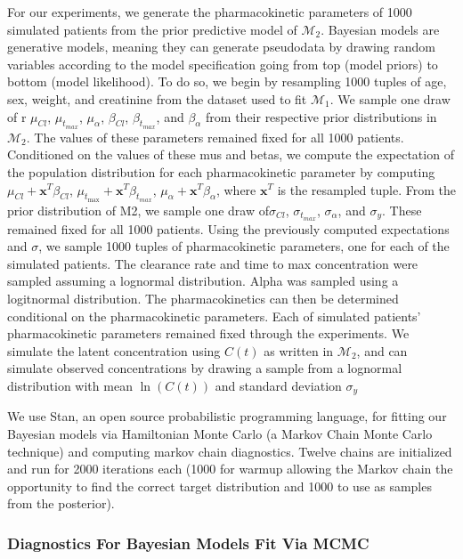 For our experiments, we generate the pharmacokinetic parameters of 1000 simulated patients from the prior predictive model of $ \mathcal{M}_2 $. Bayesian models are generative models, meaning they can generate pseudodata by drawing random variables according to the model specification going from top (model priors) to bottom (model likelihood).  To do so, we begin by resampling 1000 tuples of age, sex, weight, and creatinine from the dataset used to fit $ \mathcal{M_1} $. We sample one draw of r $ \mu_{Cl} $, $ \mu_{t_{max}} $, $ \mu_{\alpha}$, $ \beta_{Cl} $, $ \beta_{t_{max}} $, and $ \beta_{\alpha} $  from their respective prior distributions in  $ \mathcal{M}_2 $. The values of these parameters remained fixed for all 1000 patients. Conditioned on the values of these mus and betas, we compute the expectation of the population distribution for each pharmacokinetic parameter by computing $ \mu_{Cl} + \mathbf{x}^T \beta_{Cl} $, $ \mu_{t_{\max}} + \mathbf{x}^T \beta_{t_{max}} $,  $ \mu_{\alpha} + \mathbf{x}^T \beta_{\alpha} $, where $\mathbf{x}^T$ is the resampled tuple.  From the prior distribution of M2, we sample one draw of$ \sigma_{Cl} $, $ \sigma_{t_{max}} $, $ \sigma_{\alpha} $, and $ \sigma_y $.  These remained fixed for all 1000 patients. Using the previously computed expectations and $\sigma$, we sample 1000 tuples of pharmacokinetic parameters, one for each of the simulated patients.  The clearance rate and time to max concentration were sampled assuming a lognormal distribution.  Alpha was sampled using a logitnormal distribution. The pharmacokinetics can then be determined conditional on the pharmacokinetic parameters. Each of simulated patients' pharmacokinetic parameters remained fixed through the experiments.  We simulate the latent concentration using $ C(t) $ as written in $\mathcal{M}_2$, and can simulate observed concentrations by drawing a sample from a lognormal distribution with mean $\ln(C(t))$ and standard deviation $ \sigma_y$

We use Stan, an open source probabilistic programming language, for fitting our Bayesian models via Hamiltonian Monte Carlo (a Markov Chain Monte Carlo technique) and computing markov chain diagnostics. Twelve chains are initialized and run for 2000 iterations each (1000 for warmup allowing the Markov chain the opportunity to find the correct target distribution and 1000 to use as samples from the posterior).


\subsubsection{Diagnostics For Bayesian Models Fit Via MCMC}

